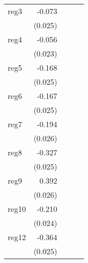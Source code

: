 {\begin{longtable}{l*{4}{D{.}{.}{-1}}}
\addlinespace
reg3        &      -0.073\sym{**} &                     &                     &                     \\
            &     (0.025)         &                     &                     &                     \\
\addlinespace
reg4        &      -0.056\sym{*}  &                     &                     &                     \\
            &     (0.023)         &                     &                     &                     \\
\addlinespace
reg5        &      -0.168\sym{***}&                     &                     &                     \\
            &     (0.025)         &                     &                     &                     \\
\addlinespace
reg6        &      -0.167\sym{***}&                     &                     &                     \\
            &     (0.025)         &                     &                     &                     \\
\addlinespace
reg7        &      -0.194\sym{***}&                     &                     &                     \\
            &     (0.026)         &                     &                     &                     \\
\addlinespace
reg8        &      -0.327\sym{***}&                     &                     &                     \\
            &     (0.025)         &                     &                     &                     \\
\addlinespace
reg9        &       0.392\sym{***}&                     &                     &                     \\
            &     (0.026)         &                     &                     &                     \\
\addlinespace
reg10       &      -0.210\sym{***}&                     &                     &                     \\
            &     (0.024)         &                     &                     &                     \\
\addlinespace
reg12       &      -0.364\sym{***}&                     &                     &                     \\
            &     (0.025)         &                     &                     &                     \\

\end{longtable}}
